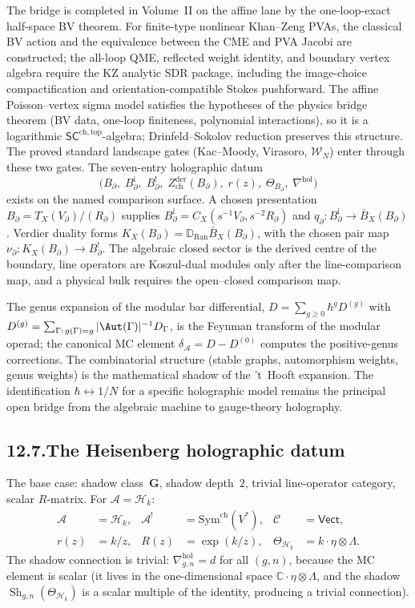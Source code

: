 \documentclass[11pt]{report}
\theoremstyle{definition}
\theoremstyle{remark}
\providecommand{\cA}{\mathcal{A}}
\providecommand{\cC}{\mathcal{C}}
\providecommand{\barB}{\bar{B}}
\providecommand{\Ran}{\mathrm{Ran}}
\numberwithin{equation}{section}
\begin{document}
The bridge is completed in Volume~II on the affine lane by the
one-loop-exact half-space BV theorem. For finite-type nonlinear
Khan--Zeng PVAs, the classical BV action and the equivalence between
the CME and PVA Jacobi are constructed; the all-loop QME, reflected
weight identity, and boundary vertex algebra require the KZ analytic
SDR package, including the image-choice compactification and
orientation-compatible Stokes pushforward. The affine
Poisson--vertex sigma model satisfies the hypotheses of the physics
bridge theorem (BV data, one-loop finiteness, polynomial
interactions), so it is a logarithmic
$\mathsf{SC}^{\mathrm{ch,top}}$-algebra; Drinfeld--Sokolov
reduction preserves this structure. The proved standard
landscape gates (Kac--Moody, Virasoro, $\mathcal W_N$) enter through
these two gates. The seven-entry holographic datum
\[
\bigl(B_\partial,\;B_\partial^{\mathrm i},\;B_\partial^!,\;
Z^{\mathrm{der}}_{\mathrm{ch}}(B_\partial),\;r(z),\;
\Theta_{B_\partial},\;\nabla^{\mathrm{hol}}\bigr)
\]
exists on the named comparison surface.  A chosen presentation
\(B_\partial=T_X(V_\partial)/(R_\partial)\) supplies
\(B_\partial^{\mathrm i}=C_X(s^{-1}V_\partial,s^{-2}R_\partial)\)
and
\(q_\partial\colon B_\partial^{\mathrm i}\to\barB_X(B_\partial)\).
Verdier duality forms
\(K_X(B_\partial)=\mathbb D_{\Ran}\barB_X(B_\partial)\), with the
chosen pair map
\(\nu_\partial\colon K_X(B_\partial)\to B_\partial^!\).
The algebraic closed sector is
the derived centre of the boundary, line operators are Koszul-dual
modules only after the line-comparison map, and a physical bulk
requires the open--closed comparison map.

The genus expansion of the modular bar differential,
$D = \sum_{g \ge 0}\hbar^g D^{(g)}$ with
$D^{(g)} = \sum_{\Gamma:\,g(\Gamma)=g}|\Aut(\Gamma)|^{-1}D_\Gamma$,
is the Feynman transform of the modular operad; the canonical MC
element $\delta_\cA = D - D^{(0)}$ computes the positive-genus
corrections. The combinatorial structure (stable graphs,
automorphism weights, genus weights) is the mathematical shadow
of the 't~Hooft expansion. The identification $\hbar
\leftrightarrow 1/N$ for a specific holographic model remains the
principal open bridge from the algebraic machine to gauge-theory
holography.

\subsection*{12.7.\enspace The Heisenberg holographic datum}

The base case: shadow class~$\mathbf G$, shadow depth~$2$, trivial line-operator
category, scalar $R$-matrix.
For $\cA=\mathcal H_k$:
\begin{align*}
\cA&=\mathcal H_k,
&\cA^!&=\mathrm{Sym}^{\mathrm{ch}}(V^*),
&\cC&=\mathsf{Vect},\\[4pt]
r(z)&=k/z,
&R(z)&=\exp(k/z),
&\Theta_{\mathcal H_k}&=k\cdot\eta\otimes\Lambda.
\end{align*}
The shadow connection is trivial:
$\nabla^{\mathrm{hol}}_{g,n}=d$ for all $(g,n)$, because the MC
element is scalar (it lives in the one-dimensional space
$\mathbb C\cdot\eta\otimes\Lambda$, and the shadow
$\operatorname{Sh}_{g,n}(\Theta_{\mathcal H_k})$ is a scalar
multiple of the identity, producing a trivial connection).
\end{document}
